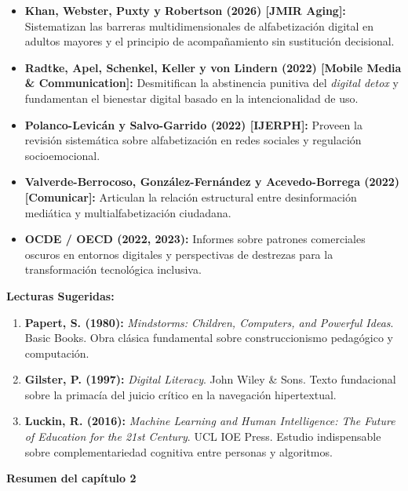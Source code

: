 \begin{itemize}
    \item \textbf{Khan, Webster, Puxty y Robertson (2026) [JMIR Aging]:} Sistematizan las barreras multidimensionales de alfabetización digital en adultos mayores y el principio de acompañamiento sin sustitución decisional.
    \item \textbf{Radtke, Apel, Schenkel, Keller y von Lindern (2022) [Mobile Media \& Communication]:} Desmitifican la abstinencia punitiva del \textit{digital detox} y fundamentan el bienestar digital basado en la intencionalidad de uso.
    \item \textbf{Polanco-Levicán y Salvo-Garrido (2022) [IJERPH]:} Proveen la revisión sistemática sobre alfabetización en redes sociales y regulación socioemocional.
    \item \textbf{Valverde-Berrocoso, González-Fernández y Acevedo-Borrega (2022) [Comunicar]:} Articulan la relación estructural entre desinformación mediática y multialfabetización ciudadana.
    \item \textbf{OCDE / OECD (2022, 2023):} Informes sobre patrones comerciales oscuros en entornos digitales y perspectivas de destrezas para la transformación tecnológica inclusiva.
\end{itemize}
\vspace{0.4cm}

\textbf{Lecturas Sugeridas:}\\[0.2cm]
\begin{enumerate}
    \item \textbf{Papert, S. (1980):} \textit{Mindstorms: Children, Computers, and Powerful Ideas}. Basic Books. Obra clásica fundamental sobre construccionismo pedagógico y computación.
    \item \textbf{Gilster, P. (1997):} \textit{Digital Literacy}. John Wiley \& Sons. Texto fundacional sobre la primacía del juicio crítico en la navegación hipertextual.
    \item \textbf{Luckin, R. (2016):} \textit{Machine Learning and Human Intelligence: The Future of Education for the 21st Century}. UCL IOE Press. Estudio indispensable sobre complementariedad cognitiva entre personas y algoritmos.
\end{enumerate}

\newpage

\newpage
{}
\vspace*{0.8cm}
{\Huge \textbf{Resumen del capítulo 2}}
\vspace{0.8cm}


